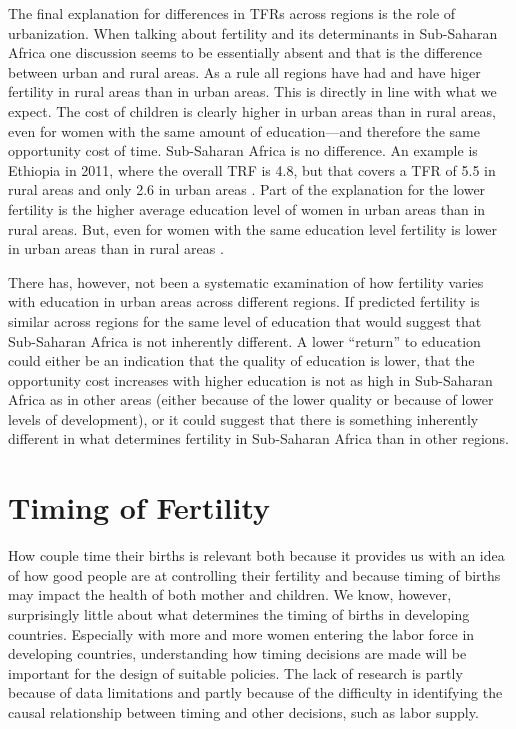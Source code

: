 \documentclass[]{article}
\begin{document}
The final explanation for differences in TFRs across regions is the role of urbanization. When talking about fertility and its determinants in Sub-Saharan Africa one discussion seems to be essentially absent and that is the difference between urban and rural areas. As a rule all regions have had and have higer fertility in rural areas than in urban areas. This is directly in line with what we expect. The cost of children is clearly higher in urban areas than in rural areas, even for women with the same amount of education---and therefore the same opportunity cost of time. Sub-Saharan Africa is no difference. An example is Ethiopia in 2011, where the overall TRF is 4.8, but that covers a TFR of 5.5 in rural areas and only 2.6 in urban areas \citep{Central-Statistical-Agency/Ethiopia2012}. Part of the explanation for the lower fertility is the higher average education level of women in urban areas than in rural areas. But, even for women with the same education level fertility is lower in urban areas than in rural areas \citep{Ainsworth1996}.

There has, however, not been a systematic examination of how fertility varies with education in urban areas across different regions. If predicted fertility is similar across regions for the same level of education that would suggest that Sub-Saharan Africa is not inherently different. A lower ``return'' to education could either be an indication that the quality of education is lower, that the opportunity cost increases with higher education is not as high in Sub-Saharan Africa as in other areas (either because of the lower quality or because of lower levels of development), or it could suggest that there is something inherently different in what determines fertility in Sub-Saharan Africa than in other regions.

\section{Timing of Fertility}\label{timing-of-fertility}

How couple time their births is relevant both because it provides us with an idea of how good people are at controlling their fertility and because timing of births may impact the health of both mother and children. We know, however, surprisingly little about what determines the timing of births in developing countries. Especially with more and more women entering the labor force in developing countries, understanding how timing decisions are made will be important for the design of suitable policies. The lack of research is partly because of data limitations and partly because of the difficulty in identifying the causal relationship between timing and other decisions, such as labor supply.
\end{document}
